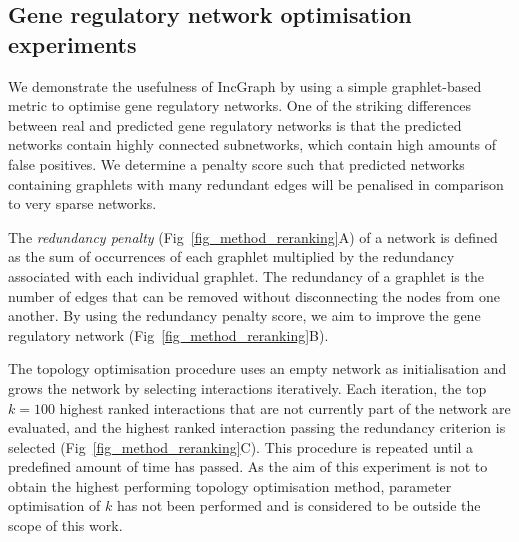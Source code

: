 \subsection*{Gene regulatory network optimisation experiments}
We demonstrate the usefulness of IncGraph by using a simple graphlet-based metric to optimise gene regulatory networks. 
One of the striking differences between real and predicted gene regulatory networks is that the predicted networks contain highly connected subnetworks, which contain high amounts of false positives.
We determine a penalty score such that predicted networks containing graphlets with many redundant edges will be penalised in comparison to very sparse networks. 

The \textit{redundancy penalty} (Fig~\ref{fig_method_reranking}A) of a network is defined as the sum of occurrences of each graphlet multiplied by the redundancy associated with each individual graphlet. The redundancy of a graphlet is the number of edges that can be removed without disconnecting the nodes from one another.
By using the redundancy penalty score, we aim to improve the gene regulatory network (Fig~\ref{fig_method_reranking}B). 

The topology optimisation procedure uses an empty network as initialisation and grows the network by selecting interactions iteratively. Each iteration, the top $k = 100$ highest ranked interactions that are not currently part of the network are evaluated, and the highest ranked interaction passing the redundancy criterion is selected (Fig~\ref{fig_method_reranking}C). This procedure is repeated until a predefined amount of time has passed.
As the aim of this experiment is not to obtain the highest performing topology optimisation method, parameter optimisation of $k$  has not been performed and is considered to be outside the scope of this work.




